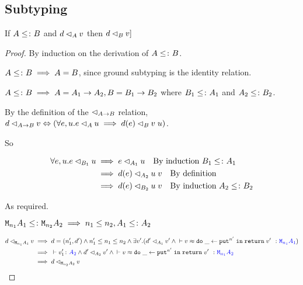 \documentclass{Report}
\begin{document}
\subsection{Subtyping}

\begin{theorem}
    If $A\leq\colon B$ and $d \lhd_{A} v$ then $d \lhd_{B} v]$
\end{theorem}

\begin{proof}
    By induction on the derivation of $A\leq\colon B$.

        $A\leq\colon B\implies A = B$, since ground subtyping is the identity relation.

        $A\leq\colon B\implies A = A_1\rightarrow A_2, B = B_1\rightarrow B_2$ where $B_1\leq\colon A_1$ and $A_2\leq\colon B_2$.

        By the definition of the $\lhd_{A\rightarrow B}$ relation, $\logRel{d}{\ab}{v} \Leftrightarrow (\forall e, u. \logRel{e}{A}{u}\implies \logRel{d(e)}{B}{\apply{v}{u}})$.

        So 

        \begin{align}
            \forall e, u. e \lhd_{B_1} u & \implies e \lhd_{A_1} u \quad\text{By induction $B_1\leq\colon A_1$}\\
            & \implies d(e) \lhd_{A_2} u\; v\quad\text{By definition}\\
            & \implies d(e) \lhd_{B_2} u\; v\quad\text{By induction $A_2\leq\colon B_2$}
        \end{align}

        As required.

    $\texttt{M}_{n_1}{A_1} \leq\colon \texttt{M}_{n_2}{A_2} \implies n_1\leq n_2, A_1\leq\colon A_2$

    \begin{align}
        \logRel{d}{\M{n_1}{A_1}}{v} & \implies  d=(n_1', d') \wedge n_1' \leq n_1\leq n_2 \wedge \exists v'. (\logRel{d'}{A_1}{v'} \wedge\zberelation{v}{\doin{\_}{\put^{n'}}{\return{v'}}}{\M{n_1}{A_1}})\\
        & \implies \ztyperelation{v_1'}{A_2} \wedge \logRel{d'}{A_2}{v'} \wedge \zberelation{v}{\doin{\_}{\put^{n'}}{\return{v'}}}{\M{n_1}{A_2}}\\
        & \implies \logRel{d}{\M{n_2}{A_2}}{v}
    \end{align}
\end{proof}
\end{document}
